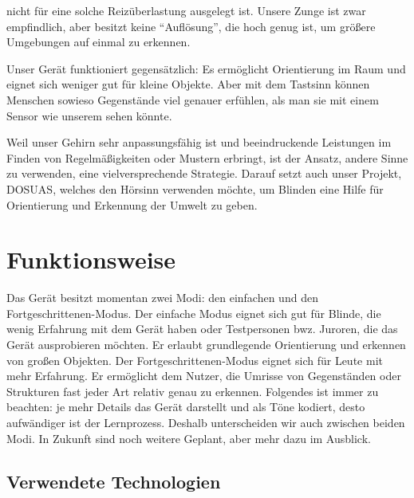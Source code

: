 \documentclass[a4paper,12pt,ngerman]{scrartcl}
\begin{document}
nicht für eine solche Reizüberlastung ausgelegt ist. Unsere Zunge ist zwar empfindlich, aber besitzt keine
\enquote{Auflösung}, die hoch genug ist, um größere Umgebungen auf einmal zu erkennen.\par 
Unser Gerät funktioniert gegensätzlich: Es ermöglicht 
Orientierung im Raum und eignet sich weniger gut für kleine Objekte. Aber mit dem Tastsinn können Menschen
sowieso Gegenstände viel genauer erfühlen, als man sie mit einem Sensor wie unserem sehen könnte.\par
Weil unser Gehirn sehr anpassungsfähig ist und beeindruckende
Leistungen im Finden von Regelmäßigkeiten oder Mustern erbringt, ist der Ansatz,
andere Sinne zu verwenden, eine vielversprechende Strategie. Darauf setzt auch 
unser Projekt, DOSUAS, welches den Hörsinn verwenden möchte, um Blinden eine Hilfe
für Orientierung und Erkennung der Umwelt zu geben.

\newpage

\section{Funktionsweise}

Das Gerät besitzt momentan zwei Modi: den einfachen und den Fortgeschrittenen-Modus. Der einfache Modus 
eignet sich gut für Blinde, die wenig Erfahrung mit dem Gerät haben oder Testpersonen bwz. Juroren, die das
Gerät ausprobieren möchten. Er erlaubt grundlegende Orientierung und erkennen von großen Objekten. Der
Fortgeschrittenen-Modus eignet sich für Leute mit mehr Erfahrung. Er ermöglicht dem Nutzer, die Umrisse von 
Gegenständen oder Strukturen fast jeder Art relativ genau zu erkennen. Folgendes ist immer zu beachten: 
je mehr Details das Gerät darstellt und als Töne kodiert, desto aufwändiger ist der Lernprozess. 
Deshalb unterscheiden wir auch zwischen beiden Modi. In Zukunft sind noch weitere Geplant, aber mehr dazu im 
Ausblick.

\subsection{Verwendete Technologien}
\end{document}
